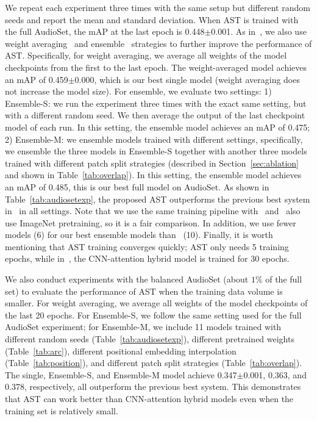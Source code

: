 \documentclass[a4paper]{article}
\begin{document}
We repeat each experiment three times with the same setup but different random seeds and report the mean and standard deviation. When AST is trained with the full AudioSet, the mAP at the last epoch is 0.448$\pm$0.001. As in~\cite{gong2021psla}, we also use weight averaging~\cite{izmailov2018averaging} and ensemble~\cite{breiman1996bagging} strategies to further improve the performance of AST. Specifically, for weight averaging, we average all weights of the model checkpoints from the first to the last epoch. The weight-averaged model achieves an mAP of 0.459$\pm$0.000, which is our best single model (weight averaging does not increase the model size). For ensemble, we evaluate two settings: 1) Ensemble-S: we run the experiment three times with the exact same setting, but with a different random seed. We then average the output of the last checkpoint model of each run. In this setting, the ensemble model achieves an mAP of 0.475; 2) Ensemble-M: we ensemble models trained with different settings, specifically, we ensemble the three models in Ensemble-S together with another three models trained with different patch split strategies (described in Section~\ref{sec:ablation} and shown in Table~\ref{tab:overlap}). In this setting, the ensemble model achieves an mAP of 0.485, this is our best full model on AudioSet. As shown in Table~\ref{tab:audiosetexp}, the proposed AST outperforms the previous best system in~\cite{gong2021psla} in all settings. Note that we use the same training pipeline with~\cite{gong2021psla} and~\cite{gong2021psla} also use ImageNet pretraining, so it is a fair comparison. In addition, we use fewer models (6) for our best ensemble models than~\cite{gong2021psla} (10). Finally, it is worth mentioning that AST training converges quickly; AST only needs 5 training epochs, while in~\cite{gong2021psla}, the CNN-attention hybrid model is trained for 30 epochs.

We also conduct experiments with the balanced AudioSet (about $1\%$ of the full set) to evaluate the performance of AST when the training data volume is smaller. For weight averaging, we average all weights of the model checkpoints of the last 20 epochs. For Ensemble-S, we follow the same setting used for the full AudioSet experiment; for Ensemble-M, we include 11 models trained with different random seeds (Table~\ref{tab:audiosetexp}), different pretrained weights (Table~\ref{tab:arc}), different positional embedding interpolation (Table~\ref{tab:position}), and different patch split strategies (Table~\ref{tab:overlap}). The single, Ensemble-S, and Ensemble-M model achieve 0.347$\pm$0.001, 0.363, and 0.378, respectively, all outperform the previous best system. This demonstrates that AST can work better than CNN-attention hybrid models even when the training set is relatively small.
\end{document}
